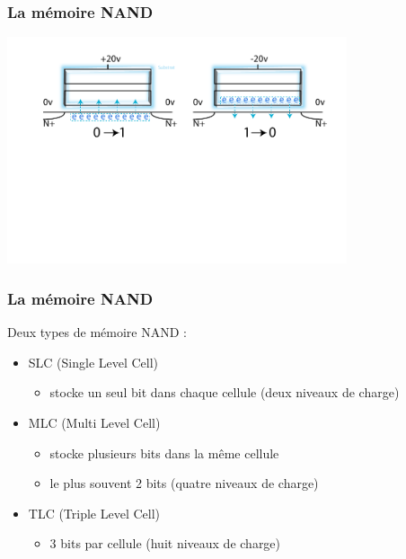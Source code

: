 \begin{frame}
\frametitle{La mémoire NAND}
\begin{center}
\includegraphics[width=10cm]{../illustration/NAND_modif.pdf}
\end{center}
\end{frame}

\begin{frame}
\frametitle{La mémoire NAND}
Deux types de mémoire NAND :
\begin{itemize}
\item SLC (Single Level Cell)
\begin{itemize}
\item stocke un seul bit dans chaque cellule (deux niveaux de charge)
\end{itemize}
\item MLC (Multi Level Cell)
\begin{itemize}
\item stocke plusieurs bits dans la même cellule
\item le plus souvent 2 bits (quatre niveaux de charge)
\end{itemize}
\item TLC (Triple Level Cell)
\begin{itemize}
\item 3 bits par cellule (huit niveaux de charge)
\end{itemize}
\end{itemize}
\end{frame}

